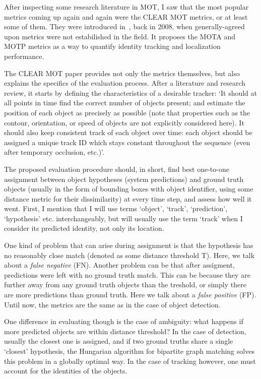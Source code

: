 After inspecting some research literature in MOT, I saw that the most popular metrics coming up again and again were the CLEAR MOT metrics, or at least some of them. They were introduced in~\cite{Bernardin2008}, back in 2008, when generally-agreed upon metrics were not estabilished in the field. It proposes the MOTA and MOTP metrics as a way to quantify identity tracking and localization performance.

The CLEAR MOT paper provides not only the metrics themselves, but also explains the specifics of the evaluation process. After a literature and research review, it starts by defining the characteristics of a desirable tracker: `It should at all points in time find the correct number of objects present; and estimate the position of each object as precisely as possible (note that properties such as the contour, orientation, or speed of objects are not explicitly considered here). It should also keep consistent track of each object over time: each object should be assigned a unique track ID which stays constant throughout the sequence (even after temporary occlusion, etc.)'.

The proposed evaluation procedure should, in short, find best one-to-one assignment between object hypotheses (system predictions) and ground truth objects (usually in the form of bounding boxes with object identifier, using some distance metric for their dissimilarity) at every time step, and assess how well it went. First, I mention that I will use terms `object', `track', `prediction', `hypothesis' etc. interchangeably, but will usually use the term `track' when I consider its predicted identity, not only its location.

One kind of problem that can arise during assignment is that the hypothesis has no reasonably close match (denoted as some distance threshold T). Here, we talk about a \textit{false negative} (FN). Another problem can be that after assigment, predictions were left with no ground truth match. This can be because they are further away from any ground truth objects than the treshold, or simply there are more predictions than ground truth. Here we talk about a \textit{false positive} (FP). Until now, the metrics are the same as in the case of object detection.

One difference in evaluating though is the case of ambiguity: what happens if more predicted objects are within distance threshold? In the case of detection, usually the closest one is assigned, and if two ground truths share a single `closest' hypothesis, the Hungarian algorithm for bipartite graph matching solves this problem in a globally optimal way. In the case of tracking however, one must account for the identities of the objects.

